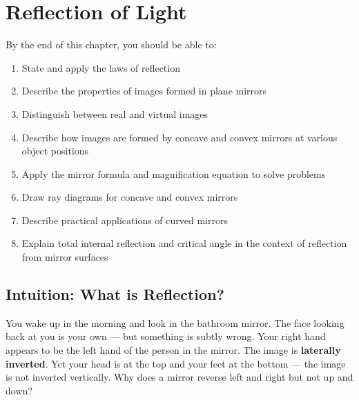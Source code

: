 %

\chapter{Reflection of Light}
\label{ch:reflection}
\minitoc
\newpage


\begin{objectivebox}
By the end of this chapter, you should be able to:
\begin{enumerate}[noitemsep]
  \item State and apply the laws of reflection
  \item Describe the properties of images formed
  in plane mirrors
  \item Distinguish between real and virtual images
  \item Describe how images are formed by concave
  and convex mirrors at various object positions
  \item Apply the mirror formula and magnification
  equation to solve problems
  \item Draw ray diagrams for concave and convex
  mirrors
  \item Describe practical applications of curved
  mirrors
  \item Explain total internal reflection and
  critical angle in the context of reflection
  from mirror surfaces
\end{enumerate}
\end{objectivebox}

\section{Intuition: What is Reflection?}

You wake up in the morning and look in the bathroom
mirror. The face looking back at you is your own ---
but something is subtly wrong. Your right hand appears
to be the left hand of the person in the mirror. The
image is \textbf{laterally inverted}. Yet your head
is at the top and your feet at the bottom --- the image
is not inverted vertically. Why does a mirror reverse
left and right but not up and down?

